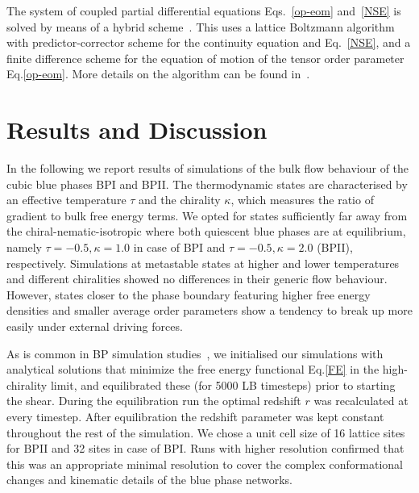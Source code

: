 \documentclass[aps,pre,reprint,superscriptaddress, twocolumn]{revtex4}
\begin{document}
The system of coupled partial differential equations Eqs.~\ref{op-eom}
and~\ref{NSE} is solved by means of a
hybrid scheme~\cite{Marenduzzo:2007}. This uses a lattice Boltzmann algorithm
with predictor-corrector scheme for the continuity equation and
Eq.~\ref{NSE}, and a finite difference scheme for the equation of motion of
the tensor order parameter Eq.\ref{op-eom}. More details on the algorithm can
be found in~\cite{Denniston:2001, Denniston:2004}.


\section{Results and Discussion}

In the following we report results of simulations of the bulk flow behaviour of the cubic blue 
phases BPI and BPII. The thermodynamic states are characterised by an effective temperature 
$\tau$ and the chirality $\kappa$, which measures the ratio of gradient to bulk free energy terms.
We opted for states sufficiently far away from the chiral-nematic-isotropic 
where both quiescent blue phases are at equilibrium, namely
$\tau=-0.5, \kappa=1.0$ in case of BPI and $\tau=-0.5, \kappa=2.0$ (BPII), respectively.
Simulations at metastable states at higher and lower temperatures and different chiralities showed 
no differences in their generic flow behaviour.
However, states closer to the phase boundary featuring higher free energy densities and 
smaller average order parameters show a tendency to break up more easily under external driving forces.

As is common in BP simulation studies~\cite{Henrich:2011a,Henrich:2010b}, we initialised our simulations with 
analytical solutions that minimize the free energy functional Eq.\ref{FE} in the high-chirality limit, 
and equilibrated these (for 5000 LB timesteps) prior to starting the shear. 
During the equilibration run the optimal redshift $r$ was recalculated at every timestep.
After equilibration the redshift parameter was kept constant throughout the rest of the simulation.
We chose a unit cell size of 16 lattice sites for BPII and 32 sites in case of BPI. 
Runs with higher resolution confirmed that this was an appropriate minimal resolution to cover 
the complex conformational changes and kinematic details of the blue phase networks.
\end{document}
